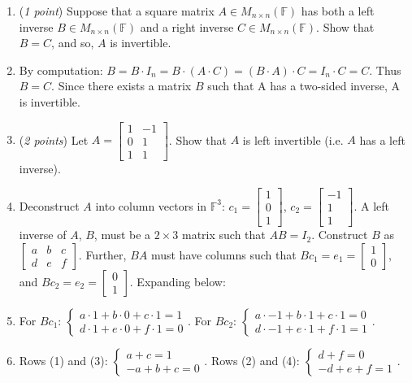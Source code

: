 \documentclass[11pt]{article}
\newcommand{\bbF}{\mathbb{F}}
\theoremstyle{definition}
\numberwithin{equation}{subsection}
\begin{document}
\begin{enumerate}
\begin{enumerate}
\item (\emph {1 point}) Suppose that a square matrix $A\in M_{n\times n}(\bbF)$ has both a left inverse $B \in M_{n\times n}(\bbF)$ and a right inverse $C \in M_{n\times n}(\bbF)$. Show that $B=C$, and so, $A$ is invertible.
\item[] By computation: $B=B\cdot I_n=B\cdot (A\cdot C)=(B\cdot A)\cdot C=I_n\cdot C=C$. Thus $B=C$. Since there exists a matrix $B$ such that A has a two-sided inverse, A is invertible.
\item (\emph {2 points}) Let $A=\begin{bmatrix} 1 & -1\\ 0 & 1\\ 1 & 1\end{bmatrix}$. Show that $A$ is left invertible (i.e. $A$ has a left inverse).
\item[] Deconstruct $A$ into column vectors in $\bbF^3$: $c_1=\begin{bmatrix}1\\0\\1\end{bmatrix}$, $c_2=\begin{bmatrix}-1\\1\\1\end{bmatrix}$. A left inverse of $A$, $B$, must be a $2\times 3$ matrix such that $AB=I_2$. Construct $B$ as $\begin{bmatrix}a&b&c\\d&e&f\end{bmatrix}$. Further, $BA$ must have columns such that $Bc_1=e_1=\begin{bmatrix}1\\0\end{bmatrix}$, and $Bc_2=e_2=\begin{bmatrix}0\\1\end{bmatrix}$. Expanding below:
\item[] For $Bc_1$: $\begin{cases}
    a\cdot 1+b\cdot 0+c\cdot 1=1 \\ d\cdot 1+e\cdot 0+f\cdot 1=0
\end{cases}$. For $Bc_2$: $\begin{cases}
    a\cdot-1+b\cdot 1+c\cdot 1=0 \\ d\cdot -1+e\cdot1+f\cdot 1=1
\end{cases}$. 
\item[] Rows (1) and (3): $\begin{cases}a+c=1\\-a+b+c=0\end{cases}$. Rows (2) and (4): $\begin{cases}d+f=0\\-d+e+f=1\end{cases}$.

\end{enumerate}
\end{enumerate}
\end{document}
